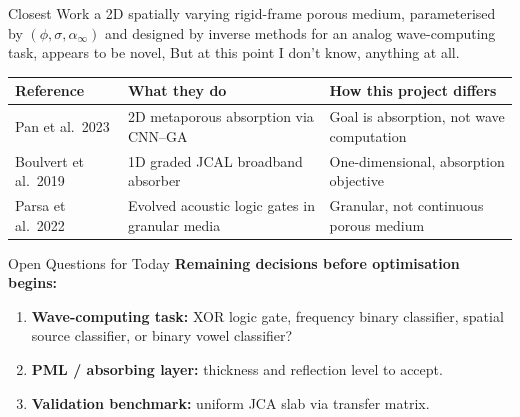 \documentclass[aspectratio=169,11pt]{beamer}
\begin{document}
\begin{frame}{Closest Work}
  a 2D spatially varying rigid-frame porous medium, parameterised by $(\phi,\sigma,\alpha_\infty)$ and designed by inverse methods for an analog wave-computing task, appears to be novel, But at this point I don't know, anything at all.

  \vspace{0.2cm}
  \footnotesize
  \begin{table}
    \centering
    \renewcommand{\arraystretch}{1.05}
    \begin{tabular}{@{}>{\raggedright}p{3.4cm}>{\raggedright}p{4.0cm}>{\raggedright\arraybackslash}p{4.8cm}@{}}
      \toprule
      \textbf{Reference} & \textbf{What they do} & \textbf{How this project differs} \\
      \midrule
      Pan et al.\ 2023 & 2D metaporous absorption via CNN--GA & Goal is absorption, not wave computation \\
      Boulvert et al.\ 2019 & 1D graded JCAL broadband absorber & One-dimensional, absorption objective \\
      Parsa et al.\ 2022 & Evolved acoustic logic gates in granular media & Granular, not continuous porous medium \\
      \bottomrule
    \end{tabular}
  \end{table}
\end{frame}

\begin{frame}{Open Questions for Today}
  \textbf{Remaining decisions before optimisation begins:}
  \begin{enumerate}
    \item \textbf{Wave-computing task:} XOR logic gate, frequency binary classifier, spatial source classifier, or binary vowel classifier?
    \item \textbf{PML / absorbing layer:} thickness and reflection level to accept.
    \item \textbf{Validation benchmark:} uniform JCA slab via transfer matrix.
  \end{enumerate}

  \vspace{0.3cm}
\end{frame}
\end{document}
